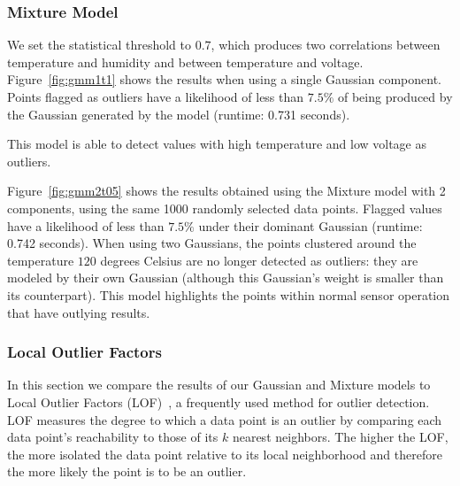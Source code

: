 \subsubsection{Mixture Model}
We set the statistical threshold to $0.7$, which produces two correlations between temperature and humidity and between temperature and voltage. 
Figure~\ref{fig:gmm1t1} shows the results when using a single Gaussian component. Points flagged as outliers have a likelihood of less than $7.5\%$ of being produced by the Gaussian generated by the model (runtime: 0.731 seconds).

This model is able to detect values with high temperature and low voltage as outliers.
 
 
Figure~\ref{fig:gmm2t05} shows the results obtained using the Mixture model with 2 components, using the same 1000 randomly selected data points. Flagged values have a likelihood of less than $7.5\%$ under their dominant Gaussian (runtime: 0.742 seconds).
When using two Gaussians, the points clustered around the temperature $120$ degrees Celsius are no longer detected as outliers: they are modeled by their own Gaussian (although this Gaussian's weight is smaller than its counterpart). This model highlights the points within normal sensor operation that have outlying results.


\subsubsection{Local Outlier Factors}
\label{sec:lof-evaluation}

In this section we compare the results of our Gaussian and Mixture models to Local Outlier Factors (LOF)~\cite{Breunig2000}, a frequently used method for outlier detection.
LOF measures the degree to which a data point is an outlier by comparing each data point's reachability to those of its $k$ nearest neighbors.
The higher the LOF, the more isolated the data point relative to its local neighborhood and therefore the more likely the point is to be an outlier.

